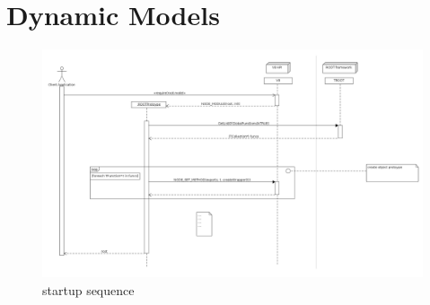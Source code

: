 \pagebreak[4]

\section{Dynamic Models}
\begin{figure}[htb]
	\centering
	\includegraphics[width=18cm]{./latex/resources/startupSequence.png}
	\caption{startup sequence}
\end{figure}